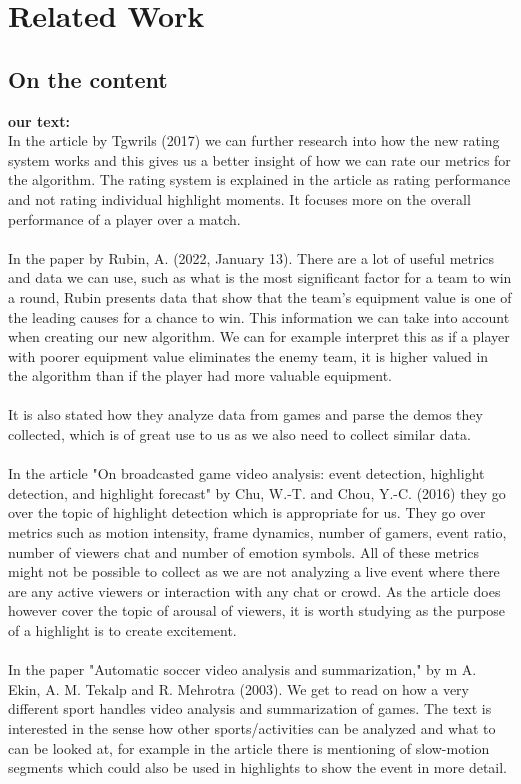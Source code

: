 \documentclass[a4paper,twoside]{bth}
\begin{document}
\chapter{Related Work}
\label{chp:relatedwork}
\section{On the content}
\textbf{our text:}\\
In the article \cite{Tgwri1s2017} by Tgwrils (2017) we can further research into how the new rating system works and this gives us a better insight of how we can rate our metrics for the algorithm. The rating system is explained in the article as rating performance and not rating individual highlight moments. It focuses more on the overall performance of a player over a match. 
\\\\
In the paper \cite{Rubin2022} by Rubin, A. (2022, January 13). There are a lot of useful metrics and data we can use, such as what is the most significant factor for a team to win a round, Rubin presents data that show that the team's equipment value is one of the leading causes for a chance to win. This information we can take into account when creating our new algorithm. We can for example interpret this as if a player with poorer equipment value eliminates the enemy team, it is higher valued in the algorithm than if the player had more valuable equipment.\\\\ 
It is also stated how they analyze data from games and parse the demos they collected, which is of great use to us as we also need to collect similar data.\\\\
In the article "On broadcasted game video analysis: event detection, highlight detection, and highlight forecast" by Chu, W.-T. and Chou, Y.-C. (2016) they go over the topic of highlight detection which is appropriate for us. They go over metrics such as motion intensity, frame dynamics, number of gamers, event ratio, number of viewers chat and number of emotion symbols. All of these metrics might not be possible to collect as we are not analyzing a live event where there are any active viewers or interaction with any chat or crowd. As the article does however cover the topic of arousal of viewers, it is worth studying as the purpose of a highlight is to create excitement.\\\\
In the paper  "Automatic soccer video analysis and summarization," by m A. Ekin, A. M. Tekalp and R. Mehrotra (2003). We get to read on how a very different sport handles video analysis and summarization of games. The text is interested in the sense how other sports/activities can be analyzed and what to can be looked at, for example in the article there is mentioning of slow-motion segments which could also be used in highlights to show the event in more detail.
\end{document}

